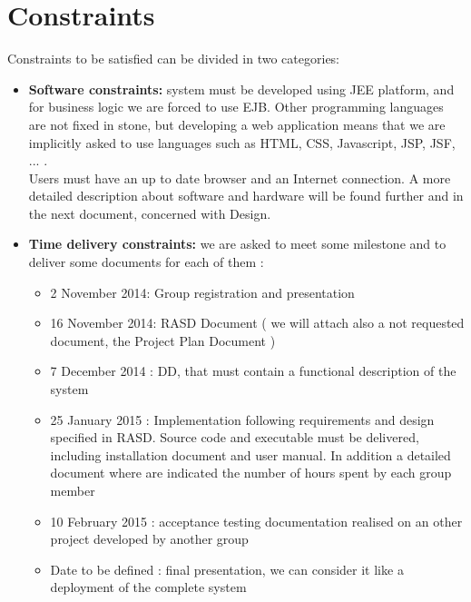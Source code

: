 \documentclass[12pt]{book}
\begin{document}
\section{Constraints}
Constraints to be satisfied can be divided in two categories: 
\begin{itemize}
	\item{\textbf{Software constraints: }system must be developed using JEE platform, and for business logic we are forced to use EJB. Other programming languages are not fixed in stone, but developing a web application means that we are implicitly asked to use languages such as HTML, CSS, Javascript, JSP, JSF, ... .\\ Users must have an up to date browser and an Internet connection. A more detailed description about software and hardware will be found further and in the next document, concerned with Design. }\\
	\item{\textbf{Time delivery constraints: } we are asked to meet some milestone and to deliver some documents for each of them : \\
	\begin{itemize}
    		\item 2 November 2014: Group registration and presentation\\
   		\item 16 November 2014: RASD Document ( we will attach also a not requested document, the Project Plan Document )\\
		\item 7 December 2014 : DD, that must contain a functional description of the system\\
		\item 25 January 2015 : Implementation following requirements and design specified in RASD. Source code and executable must be delivered, including installation document and user manual. In addition a detailed document where are indicated the number of hours spent by each group member \\
		\item 10 February 2015 : acceptance testing documentation realised on an other project developed by another group\\
		\item Date to be defined : final presentation, we can consider it like a deployment of the complete system 
  	\end{itemize}	 
	}
\end{itemize}
\end{document}
